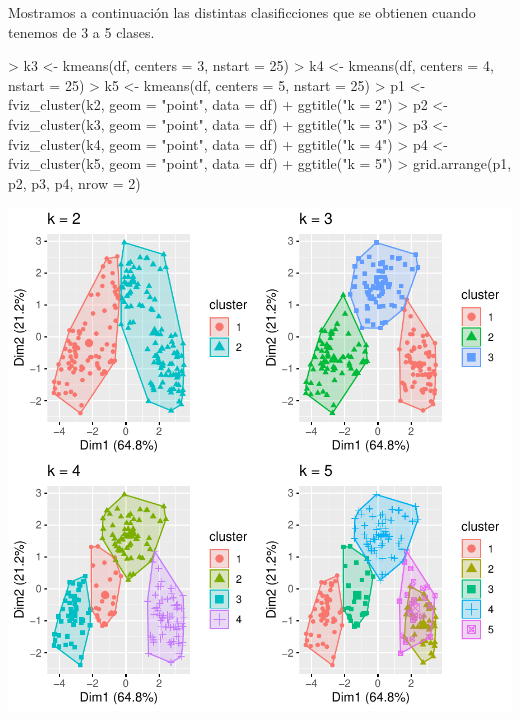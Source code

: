 \documentclass [a4paper] {article}
\begin{document}
Mostramos a continuación las distintas clasificciones que se obtienen cuando tenemos de 3 a 5 clases.
\begin{center}
\begin{Schunk}
\begin{Sinput}
> k3 <- kmeans(df, centers = 3, nstart = 25)
> k4 <- kmeans(df, centers = 4, nstart = 25)
> k5 <- kmeans(df, centers = 5, nstart = 25)
> p1 <- fviz_cluster(k2, geom = "point", data = df) + ggtitle("k = 2")
> p2 <- fviz_cluster(k3, geom = "point",  data = df) + ggtitle("k = 3")
> p3 <- fviz_cluster(k4, geom = "point",  data = df) + ggtitle("k = 4")
> p4 <- fviz_cluster(k5, geom = "point",  data = df) + ggtitle("k = 5")
> grid.arrange(p1, p2, p3, p4, nrow = 2)
\end{Sinput}
\end{Schunk}
\includegraphics{entrega-kmeans_different_number_of_clusters}
\end{center}
\end{document}
